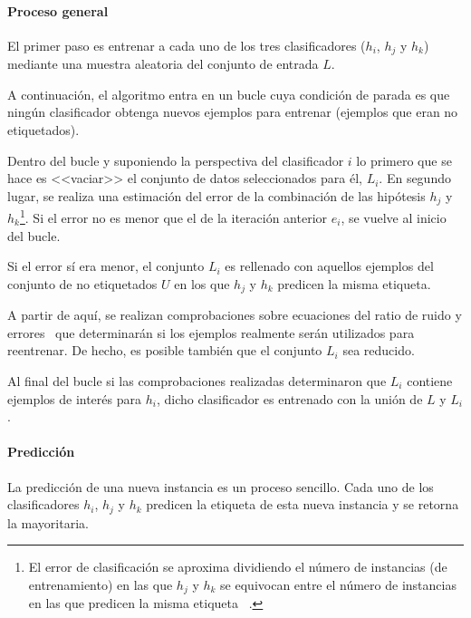 \paragraph{Proceso general}

El primer paso es entrenar a cada uno de los tres clasificadores ($h_i$, $h_j$ y
$h_k$) mediante una muestra aleatoria del conjunto de entrada $L$.

A continuación, el algoritmo entra en un bucle cuya condición de parada es que
ningún clasificador obtenga nuevos ejemplos para entrenar (ejemplos que eran no
etiquetados). 

Dentro del bucle y suponiendo la perspectiva del clasificador $i$ lo primero que
se hace es <<vaciar>> el conjunto de datos seleccionados para él, $L_i$. En
segundo lugar, se realiza una estimación del error de la combinación de las
hipótesis $h_j$ y $h_k$\footnote{El error de clasificación se aproxima
dividiendo el número de instancias (de entrenamiento) en las que $h_j$ y $h_k$
se equivocan entre el número de instancias en las que predicen la misma etiqueta
~\cite{1512038}.}. Si el error no es menor que el de la iteración anterior $e_i$,
se vuelve al inicio del bucle.

Si el error sí era menor, el conjunto $L_i$ es rellenado con aquellos ejemplos
del conjunto de no etiquetados $U$ en los que $h_j$ y $h_k$ predicen la misma
etiqueta.

A partir de aquí, se realizan comprobaciones sobre ecuaciones del ratio de ruido
y errores~\cite{1512038} que determinarán si los ejemplos realmente serán
utilizados para reentrenar. De hecho, es posible también que el conjunto $L_i$
sea reducido.

Al final del bucle si las comprobaciones realizadas determinaron que $L_i$
contiene ejemplos de interés para $h_i$, dicho clasificador es entrenado con la
unión de $L$ y $L_i$.

\paragraph{Predicción}

La predicción de una nueva instancia es un proceso sencillo. Cada uno de los
clasificadores $h_i$, $h_j$ y $h_k$ predicen la etiqueta de esta nueva instancia
y se retorna la mayoritaria.

